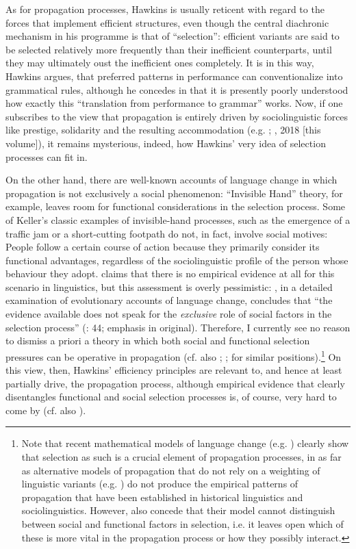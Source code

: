 \documentclass[output=paper]{langsci/langscibook}
\begin{document}
As for propagation processes, Hawkins is usually reticent with regard to the forces that implement efficient structures, even though the central diachronic mechanism in his programme is that of “selection”: efficient variants are said to be selected relatively more frequently than their inefficient counterparts, until they may ultimately oust the inefficient ones completely. It is in this way, Hawkins argues, that preferred patterns in performance can conventionalize into grammatical rules, although he concedes in \citet[10]{Hawkins2014} that it is presently poorly understood how exactly this “translation from performance to grammar” works. Now, if one subscribes to the view that propagation is entirely driven by sociolinguistic forces like prestige, solidarity and the resulting accommodation (e.g. \citealt{Croft2000}; \citealt{Cristofaro2017}, 2018 [this volume]), it remains mysterious, indeed, how Hawkins’ very idea of selection processes can fit in. 

On the other hand, there are well-known accounts of language change in which propagation is not exclusively a social phenomenon:  “Invisible Hand” theory, for example, leaves room for functional considerations in the selection process. Some of Keller’s classic examples of invisible-hand processes, such as the emergence of a traffic jam or a short-cutting footpath do not, in fact, involve social motives: People follow a certain course of action because they primarily consider its functional advantages, regardless of the sociolinguistic profile of the person whose behaviour they adopt. \citet{Cristofaro2017} claims that there is no empirical evidence at all for this scenario in linguistics, but this assessment is overly pessimistic: \citet{Rosenbach2008}, in a detailed examination of evolutionary accounts of language change, concludes that “the evidence available does not speak for the \textit{exclusive} role of social factors in the selection process” (\citealt{Rosenbach2008}: 44; emphasis in original). Therefore, I currently see no reason to dismiss a priori a theory in which both social and functional selection pressures can be operative in propagation (cf. also \citealt{Haspelmath1999}; \citealt{Nettle1999}; \citealt{Enfield2014} for similar positions).\footnote{Note that recent mathematical models of language change (e.g. \citealt{BlytheCroft2012}) clearly show that selection as such is a crucial element of propagation processes, in as far as alternative models of propagation that do not rely on a weighting of linguistic variants (e.g. \citealt{Trudgill2004}) do not produce the empirical patterns of propagation that have been established in historical linguistics and sociolinguistics. However, \citet{BlytheCroft2012} also concede that their model cannot distinguish between social and functional factors in selection, i.e. it leaves open which of these is more vital in the propagation process or how they possibly interact.} On this view, then, Hawkins’ efficiency principles are relevant to, and hence at least partially drive, the propagation process, although empirical evidence that clearly disentangles functional and social selection processes is, of course, very hard to come by (cf. also \citealt{Seiler2006}). 
\end{document}
